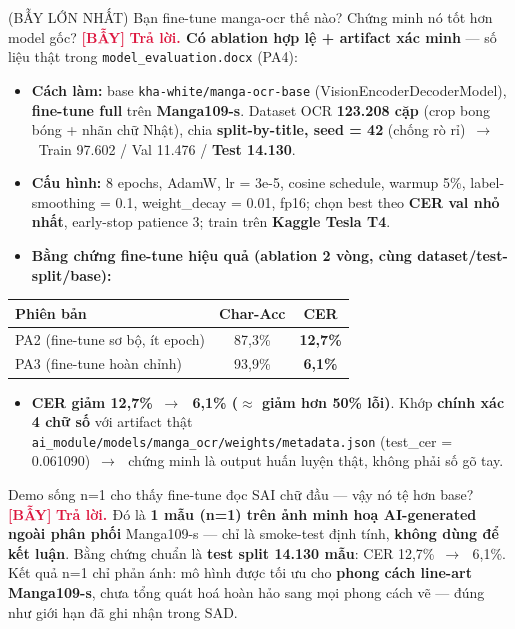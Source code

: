 \documentclass[11pt]{article}
\newcommand{\arr}{\,\ensuremath{\rightarrow}\,}
\newcommand{\code}[1]{\texttt{\small #1}}
\newcommand{\tagTrap}{\textcolor{crimson}{\footnotesize\textbf{[BẪY]}}}
\newcommand{\A}{\textbf{\textcolor{crimson}{Trả lời. }}}
\begin{document}
\begin{qa}{(BẪY LỚN NHẤT) Bạn fine-tune manga-ocr thế nào? Chứng minh nó tốt hơn model gốc? \tagTrap}
\A \textbf{Có ablation hợp lệ + artifact xác minh} --- số liệu thật trong \code{model\_evaluation.docx} (PA4):
\begin{itemize}
  \item \textbf{Cách làm:} base \code{kha-white/manga-ocr-base} (VisionEncoderDecoderModel), \textbf{fine-tune full} trên \textbf{Manga109-s}. Dataset OCR \textbf{123.208 cặp} (crop bong bóng + nhãn chữ Nhật), chia \textbf{split-by-title, seed = 42} (chống rò rỉ) \arr\ Train 97.602 / Val 11.476 / \textbf{Test 14.130}.
  \item \textbf{Cấu hình:} 8 epochs, AdamW, lr = 3e-5, cosine schedule, warmup 5\%, label-smoothing = 0.1, weight\_decay = 0.01, fp16; chọn best theo \textbf{CER val nhỏ nhất}, early-stop patience 3; train trên \textbf{Kaggle Tesla T4}.
  \item \textbf{Bằng chứng fine-tune hiệu quả (ablation 2 vòng, cùng dataset/test-split/base):}
\end{itemize}
\begin{center}\small
\begin{tabular}{lcc}
\toprule
Phiên bản & Char-Acc & CER \\
\midrule
PA2 (fine-tune sơ bộ, ít epoch) & 87,3\% & \textbf{12,7\%} \\
PA3 (fine-tune hoàn chỉnh) & 93,9\% & \textbf{6,1\%} \\
\bottomrule
\end{tabular}
\end{center}
\begin{itemize}
  \item \textbf{CER giảm 12,7\% \arr\ 6,1\% ($\approx$ giảm hơn 50\% lỗi)}. Khớp \textbf{chính xác 4 chữ số} với artifact thật \code{ai\_module/models/manga\_ocr/weights/metadata.json} (test\_cer = 0.061090) \arr\ chứng minh là output huấn luyện thật, không phải số gõ tay.
\end{itemize}
\end{qa}

\begin{qa}{Demo sống n=1 cho thấy fine-tune đọc SAI chữ đầu --- vậy nó tệ hơn base? \tagTrap}
\A Đó là \textbf{1 mẫu (n=1) trên ảnh minh hoạ AI-generated ngoài phân phối} Manga109-s --- chỉ là smoke-test định tính, \textbf{không dùng để kết luận}. Bằng chứng chuẩn là \textbf{test split 14.130 mẫu}: CER 12,7\% \arr\ 6,1\%. Kết quả n=1 chỉ phản ánh: mô hình được tối ưu cho \textbf{phong cách line-art Manga109-s}, chưa tổng quát hoá hoàn hảo sang mọi phong cách vẽ --- đúng như giới hạn đã ghi nhận trong SAD.
\end{qa}
\end{document}
